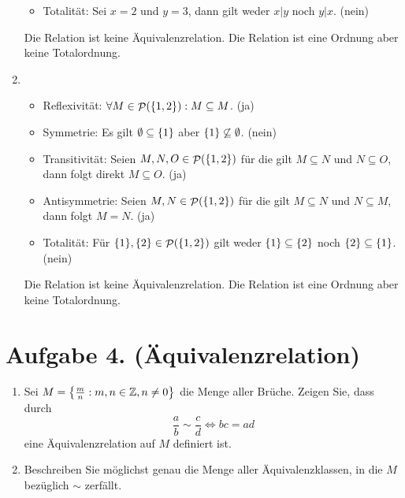 \documentclass[german,12pt]{homework}
\newcommand{\ZZ}{\mathbb{Z}}
\DeclareMathOperator{\pot}{\mathcal{P}}
\DeclarePairedDelimiter{\enbrace}{(}{)}
\DeclarePairedDelimiter{\penbrace}{\{}{\}}
\begin{document}
\begin{enumerate}
\begin{itemize}
    		\item Totalität: Sei \(x = 2\) und \(y = 3\), dann gilt weder \(x | y\) noch \(y | x\). (nein)
    	\end{itemize}
    	Die Relation ist keine Äquivalenzrelation. Die Relation ist eine Ordnung aber keine Totalordnung.
        \item\ \\
        \begin{itemize}
    		\item Reflexivität: \({\forall}M \in \pot\enbrace*{\penbrace*{1, 2}}: M \subseteq M\). (ja)
    		\item Symmetrie: Es gilt \(\emptyset \subseteq \penbrace*{1}\) aber \(\penbrace*{1} \not\subseteq \emptyset\). (nein)
    		\item Transitivität: Seien \(M, N, O \in \pot\enbrace*{\penbrace*{1, 2}}\) für die gilt \(M \subseteq N\) und \(N \subseteq O\), dann folgt direkt \(M \subseteq O\). (ja)
    		\item Antisymmetrie: Seien \(M, N \in \pot\enbrace*{\penbrace*{1, 2}}\) für die gilt \(M \subseteq N\) und \(N \subseteq M\), dann folgt \(M = N\). (ja)
    		\item Totalität: Für \(\{1\}, \{2\} \in \pot\enbrace*{\penbrace*{1, 2}}\) gilt weder \(\penbrace*{1} \subseteq \penbrace*{2}\) noch \(\penbrace*{2} \subseteq \penbrace*{1}\). (nein)
    	\end{itemize}
    	Die Relation ist keine Äquivalenzrelation. Die Relation ist eine Ordnung aber keine Totalordnung.
    \end{enumerate}

    \section*{Aufgabe 4. (Äquivalenzrelation)}

    \begin{problem}
        \begin{enumerate}
            \item Sei \(M = \penbrace*{\frac{m}{n}: m, n \in \ZZ, n \ne 0}\) die Menge aller Brüche. Zeigen Sie, dass durch
            \[\frac{a}{b} \sim \frac{c}{d} \iff bc = ad\]
            eine Äquivalenzrelation auf \(M\) definiert ist.
            \item Beschreiben Sie möglichst genau die Menge aller Äquivalenzklassen, in die \(M\) bezüglich \(\sim\) zerfällt.
        \end{enumerate}
    \end{problem}
\end{document}
